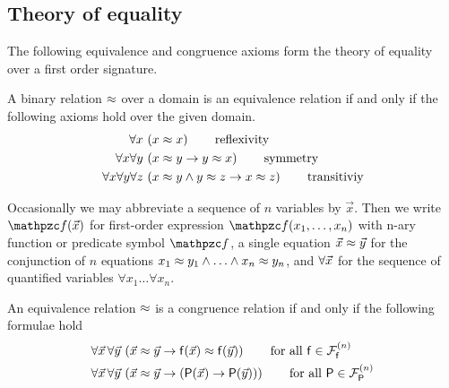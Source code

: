 \subsection{Theory of equality}

The following equivalence and congruence axioms form the theory of equality over a first order signature.

\begin{definition}
	[Equivalence] A binary relation $\approx$ over a domain 
	is an equivalence relation if and only if the following axioms hold over the given domain. 
	\label{def:equivalence:axioms}
\begin{align*}
\forall x\, 
&\left(x \approx x\right) 
\tag*{reflexivity}
\\
\forall x \forall y\, 
&\left(x \approx y \rightarrow y \approx x \right)
\tag*{symmetry} 
\\
\forall x \forall y \forall z\,
&\left(x \approx y \land y\approx z \rightarrow x\approx z\right) 
\tag*{transitiviy}
\end{align*}
\end{definition}

\begin{definition}
	Occasionally we may abbreviate a sequence of $n$ variables by $\vec{x}$.
	Then we write $\mcf(\vecn{x})$ 
	for first-order expression $\mcf(x_1,\ldots,x_n)$
	with n-ary function or predicate symbol $\mcf$,
	a single equation $\vec{x}\approx\vec{y}$ for
	the conjunction of $n$ equations 
	$x_1\approx y_1\land\ldots\land x_n\approx y_n$,
	and $\forall\vec{x}$ for 
	the sequence of quantified variables $\forall x_1\ldots\forall x_n$.
\end{definition}

\begin{definition}
	 An equivalence relation $\approx$ is a congruence relation if and only if
	the following formulae hold 
	\label{def:congruence:schemata}
	\begin{align*}
	\forall\vecn{x}\,\forall\vecn{y}\,
	&\left(\vecn{x}\mEQ\vecn{y} \limp \mf(\vecn{x}) \mEQ \mf(\vecn{y}) \right)
	\tag*{for all $\mf\in\mcFfn$}
	\\
	\forall\vecn{x}\,\forall\vecn{y}\, 
	&\left(\vecn{x}\mEQ\vecn{y} \limp (\mP(\vecn{x}) \limp \mP(\vecn{y}))\right)
	\tag*{for all $\mP\in\mcFPn$}
	\end{align*}
	
	
\end{definition}

